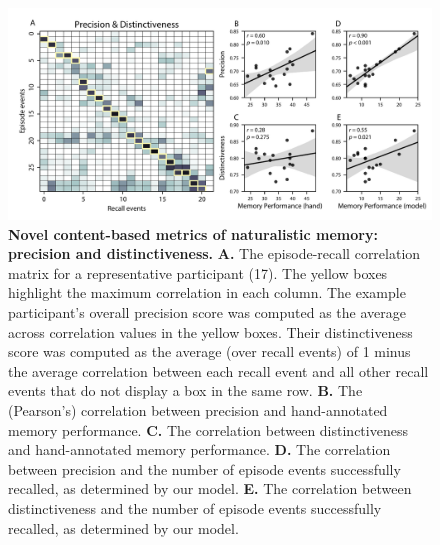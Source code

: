 \documentclass{article}
\begin{document}
\begin{figure}[t]
  \centering
  \includegraphics[width=1\textwidth]{figs/precision_distinctiveness}
  \caption{\small \textbf{Novel content-based metrics of naturalistic memory: precision and distinctiveness.} \textbf{A.} The episode-recall correlation matrix for a representative participant (17).  The yellow boxes highlight the maximum correlation in each column.  The example participant's overall precision score was computed as the average across correlation values in the yellow boxes.  Their distinctiveness score was computed as the average (over recall events) of 1 minus the average correlation between each recall event and all other recall events that do not display a box in the same row.  \textbf{B.} The (Pearson's) correlation between precision and hand-annotated memory performance. \textbf{C.} The correlation between distinctiveness and hand-annotated memory performance. \textbf{D.} The correlation between precision and the number of episode events successfully recalled, as determined by our model. \textbf{E.} The correlation between distinctiveness and the number of episode events successfully recalled, as determined by our model.}
  \label{fig:precision-distinctiveness}
\end{figure}
\end{document}

